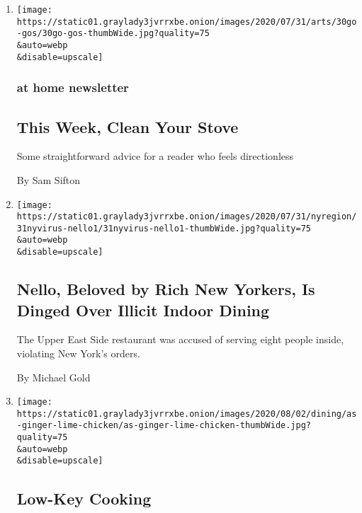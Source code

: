 \begin{enumerate}
\def\labelenumi{\arabic{enumi}.}
\item
  \href{/2020/07/31/at-home/newsletter.html}{}

  \texttt{[image: https://static01.graylady3jvrrxbe.onion/images/2020/07/31/arts/30go-gos/30go-gos-thumbWide.jpg?quality=75\\\&auto=webp\\\&disable=upscale]}

  \hypertarget{at-home-newsletter}{%
  \subsubsection{at home newsletter}\label{at-home-newsletter}}

  \hypertarget{this-week-clean-your-stove}{%
  \subsection{This Week, Clean Your
  Stove}\label{this-week-clean-your-stove}}

  Some straightforward advice for a reader who feels directionless

  By Sam Sifton
\item
  \href{/2020/07/31/nyregion/nello-liquor-license-suspended.html}{}

  \texttt{[image: https://static01.graylady3jvrrxbe.onion/images/2020/07/31/nyregion/31nyvirus-nello1/31nyvirus-nello1-thumbWide.jpg?quality=75\\\&auto=webp\\\&disable=upscale]}

  \hypertarget{nello-beloved-by-rich-new-yorkers-is-dinged-over-illicit-indoor-dining}{%
  \subsection{Nello, Beloved by Rich New Yorkers, Is Dinged Over Illicit
  Indoor
  Dining}\label{nello-beloved-by-rich-new-yorkers-is-dinged-over-illicit-indoor-dining}}

  The Upper East Side restaurant was accused of serving eight people
  inside, violating New York's orders.

  By Michael Gold
\item
  \href{/2020/07/31/dining/low-key-cooking.html}{}

  \texttt{[image: https://static01.graylady3jvrrxbe.onion/images/2020/08/02/dining/as-ginger-lime-chicken/as-ginger-lime-chicken-thumbWide.jpg?quality=75\\\&auto=webp\\\&disable=upscale]}

  \hypertarget{low-key-cooking}{%
  \subsection{Low-Key Cooking}\label{low-key-cooking}}


\end{enumerate}
